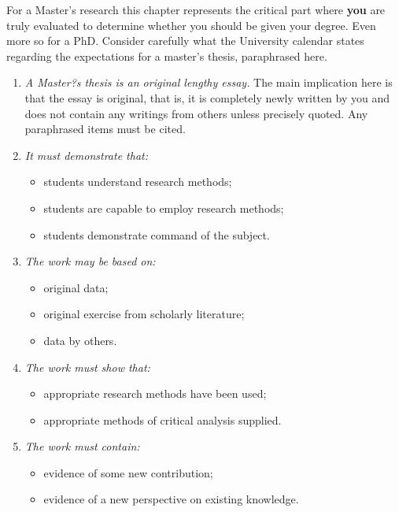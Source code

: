 \label{chapter:eval}

For a Master's research this chapter represents the critical part where \textbf{you} are truly evaluated to determine whether you should be given your degree. Even more so for a PhD. Consider carefully what the University calendar states regarding the expectations for a master's thesis, paraphrased here.

\begin{enumerate}
\item {\textit{A Master?s thesis is an original lengthy essay.} The main implication here is that the essay is original, that is, it is completely newly written by you and does not contain any writings from others unless precisely quoted. Any paraphrased items must be cited.}
\item {\textit{It must demonstrate that:}
    \begin{itemize}
    \item {students understand research methods;}
    \item {students are capable to employ research methods;}
    \item {students demonstrate command of the subject.}
    \end{itemize}}
\item {\textit{The work may be based on:}
    \begin{itemize}
    \item {original data;}
    \item {original exercise from scholarly literature;}
    \item {data by others.}
    \end{itemize}}
\item {\textit{The work must show that:}
    \begin{itemize}
    \item {appropriate research methods have been used;}
    \item {appropriate methods of critical analysis supplied.}
    \end{itemize}}
\item {\textit{The work must contain:}
    \begin{itemize}
    \item {evidence of some new contribution;}
    \item {evidence of a new perspective on existing knowledge.}
    \end{itemize}}
\end{enumerate}

